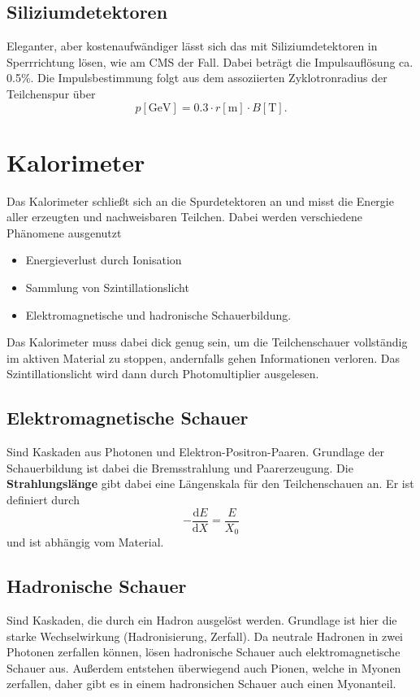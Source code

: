 \subsection{Siliziumdetektoren}
Eleganter, aber kostenaufwändiger lässt sich das mit Siliziumdetektoren in Sperrrichtung lösen, wie am CMS der Fall.
Dabei beträgt die Impulsauflösung ca. 0.5\%.
Die Impulsbestimmung folgt aus dem assoziierten Zyklotronradius der Teilchenspur über
\begin{equation*}
	p[\si{\GeV}] = 0.3\cdot r[\si{\meter}] \cdot B[\si{\tesla}].
\end{equation*}

\section{Kalorimeter}
Das Kalorimeter schließt sich an die Spurdetektoren an und misst die Energie aller erzeugten und nachweisbaren Teilchen.
Dabei werden verschiedene Phänomene ausgenutzt
\begin{itemize}
	\item Energieverlust durch Ionisation
	\item Sammlung von Szintillationslicht
	\item Elektromagnetische und hadronische Schauerbildung.
\end{itemize}
Das Kalorimeter muss dabei dick genug sein, um die Teilchenschauer vollständig im aktiven Material zu stoppen, andernfalls gehen Informationen verloren.
Das Szintillationslicht wird dann durch Photomultiplier ausgelesen.

\subsection{Elektromagnetische Schauer}
Sind Kaskaden aus Photonen und Elektron-Positron-Paaren.
Grundlage der Schauerbildung ist dabei die Bremsstrahlung und Paarerzeugung.
Die \textbf{Strahlungslänge} gibt dabei eine Längenskala für den Teilchenschauen an.
Er ist definiert durch
\begin{equation*}
	-\frac{\text{d}E}{\text{d}X} = \frac{E}{X_0}
\end{equation*}
und ist abhängig vom Material.

\subsection{Hadronische Schauer}
Sind Kaskaden, die durch ein Hadron ausgelöst werden.
Grundlage ist hier die starke Wechselwirkung (Hadronisierung, Zerfall).
Da neutrale Hadronen in zwei Photonen zerfallen können, lösen hadronische Schauer auch elektromagnetische Schauer aus.
Außerdem entstehen überwiegend auch Pionen, welche in Myonen zerfallen, daher gibt es in einem hadronsichen Schauer auch einen Myonanteil.

